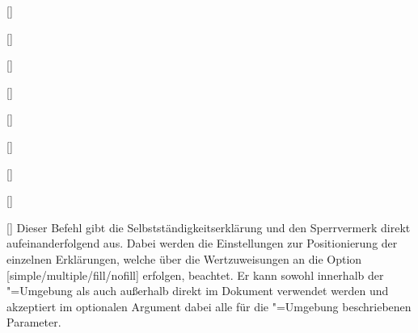 \begin{Declaration}{\LParameter}
\begin{Declaration}{[]}
\begin{Declaration}[v2.02]{%
  []%
}
\begin{Declaration}[v2.02]{%
  []%
}
\begin{Declaration}[v2.02]{[]}
\begin{Declaration}{[\PSet]}
\begin{Declaration}{[]}
\begin{Declaration}{[]}
\begin{Declaration}{[]}
\begin{Declaration}{[]}
\printdeclarationlist%
%
%
Dieser Befehl gibt die Selbstständigkeitserklärung und den Sperrvermerk direkt 
aufeinanderfolgend aus. Dabei werden die Einstellungen zur Positionierung der 
einzelnen Erklärungen, welche über die Wertzuweisungen an die Option 
[simple/multiple/fill/nofill] erfolgen, beachtet. Er kann 
sowohl innerhalb der "=Umgebung als auch außerhalb 
direkt im Dokument verwendet werden und akzeptiert im optionalen Argument dabei 
alle für die "=Umgebung beschriebenen Parameter.
\end{Declaration}
\end{Declaration}
\end{Declaration}
\end{Declaration}
\end{Declaration}
\end{Declaration}
\end{Declaration}
\end{Declaration}
\end{Declaration}
\end{Declaration}

